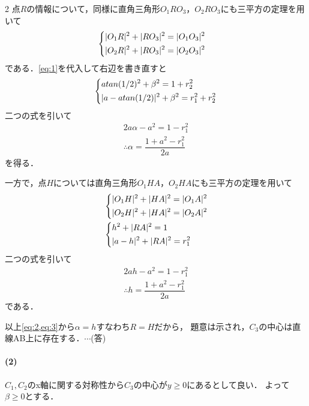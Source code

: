 \documentclass[../../main.tex]{subfiles}
\begin{document}
\begin{multicols}{2}
  点$R$の情報について，同様に直角三角形$O_1RO_3$，$O_2RO_3$にも三平方の定理を用いて
  \begin{align}
    &
    \begin{dcases}
      |O_1R|^2 + |RO_3|^2 = |O_1O_3|^2 \\
      |O_2R|^2 + |RO_3|^2 = |O_2O_3|^2
    \end{dcases}
  \end{align}
  である．\cref{eq:1}を代入して右辺を書き直すと
  \begin{align}
    \begin{dcases}
      \alpha^2     + \beta^2 =  1 + r_2^2 \\
      |a-\alpha|^2 + \beta^2 = r_1^2 + r_2^2
    \end{dcases}
  \end{align}
  二つの式を引いて
  \begin{align}
    2a\alpha -a ^2 = 1 - r_1^2 \\
    \therefore
    \alpha = \dfrac{1+a^2-r_1^2}{2a} \label{eq:2}
  \end{align}
  を得る．

  一方で，点$H$については直角三角形$O_1HA$，$O_2HA$にも三平方の定理を用いて
  \begin{align}
    &
    \begin{dcases}
      |O_1H|^2 + |HA|^2 = |O_1A|^2 \\
      |O_2H|^2 + |HA|^2 = |O_2A|^2
    \end{dcases} \\
    &
    \begin{dcases}
      h^2 + |RA|^2 = 1 \\
      |a-h|^2 + |RA|^2 = r_1^2
    \end{dcases}
  \end{align}
  二つの式を引いて
  \begin{align}
    2a h -a^2 = 1 -r_1^2 \\
    \therefore
    h = \dfrac{1+a^2-r_1^2}{2a} \label{eq:3}
  \end{align}
  である．

  以上\cref{eq:2,eq:3}から$\alpha=h$すなわち$R=H$だから，
  題意は示され，$C_3$の中心は直線AB上に存在する．$\cdots$(答)

  \paragraph{(2)}
  $C_1, C_2$のx軸に関する対称性から$C_3$の中心が$y \ge 0$にあるとして良い．
  よって$\beta \ge 0$とする．


\end{multicols}
\end{document}
